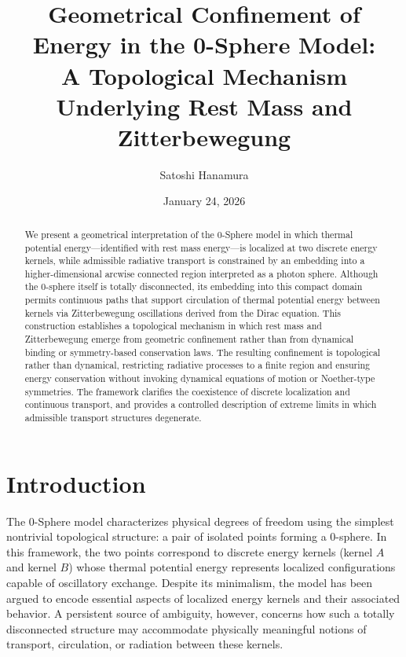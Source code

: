 \documentclass[%
 reprint,
 amsmath,amssymb,
 aps,
 prb,
]{revtex4-2}
\numberwithin{equation}{section}
\begin{document}
\title{Geometrical Confinement of Energy in the 0-Sphere Model:
\\A Topological Mechanism Underlying Rest Mass and Zitterbewegung}

\author{Satoshi Hanamura}
\date{January 24, 2026}

\begin{abstract}
We present a geometrical interpretation of the 0-Sphere model in which thermal potential energy—identified with rest mass energy—is localized at two discrete energy kernels, while admissible radiative transport is constrained by an embedding into a higher-dimensional arcwise connected region interpreted as a photon sphere.
Although the 0-sphere itself is totally disconnected, its embedding into this compact domain permits continuous paths that support circulation of thermal potential energy between kernels via Zitterbewegung oscillations derived from the Dirac equation.
This construction establishes a topological mechanism in which rest mass and Zitterbewegung emerge from geometric confinement rather than from dynamical binding or symmetry-based conservation laws.
The resulting confinement is topological rather than dynamical, restricting radiative processes to a finite region and ensuring energy conservation without invoking dynamical equations of motion or Noether-type symmetries.
The framework clarifies the coexistence of discrete localization and continuous transport, and provides a controlled description of extreme limits in which admissible transport structures degenerate.
\end{abstract}


\maketitle

\section{Introduction}
\label{sec:introduction}

The 0-Sphere model characterizes physical degrees of freedom using the simplest nontrivial topological structure: a pair of isolated points forming a 0-sphere.
In this framework, the two points correspond to discrete energy kernels (kernel $A$ and kernel $B$) whose thermal potential energy represents localized configurations capable of oscillatory exchange.
Despite its minimalism, the model has been argued to encode essential aspects of localized energy kernels and their associated behavior.
A persistent source of ambiguity, however, concerns how such a totally disconnected structure may accommodate physically meaningful notions of transport, circulation, or radiation between these kernels.
\end{document}
